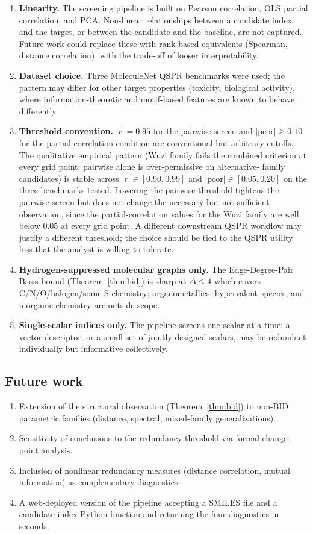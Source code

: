 \documentclass[11pt,a4paper]{article}
\theoremstyle{definition}
\begin{document}
\begin{enumerate}
\item \textbf{Linearity.} The screening pipeline is built on
Pearson correlation, OLS partial correlation, and PCA. Non-linear
relationships between a candidate index and the target, or between
the candidate and the baseline, are not captured. Future work
could replace these with rank-based equivalents (Spearman,
distance correlation), with the trade-off of looser
interpretability.
\item \textbf{Dataset choice.} Three MoleculeNet QSPR benchmarks
were used; the pattern may differ for other target properties (toxicity,
biological activity), where information-theoretic and motif-based
features are known to behave differently.
\item \textbf{Threshold convention.} $|r| = 0.95$ for the pairwise
screen and $|\mathrm{pcor}| \ge 0.10$ for the partial-correlation
condition are conventional but arbitrary cutoffs. The qualitative
empirical pattern (Wuzi family fails the combined criterion at
every grid point; pairwise alone is over-permissive on alternative-
family candidates) is stable across $|r| \in [0.90, 0.99]$ and
$|\mathrm{pcor}| \in [0.05, 0.20]$ on the three benchmarks tested.
Lowering the pairwise threshold tightens the pairwise screen but
does not change the necessary-but-not-sufficient observation, since
the partial-correlation values for the Wuzi family are well below
$0.05$ at every grid point. A different downstream QSPR workflow
may justify a different threshold; the choice should be tied to the
QSPR utility loss that the analyst is willing to tolerate.
\item \textbf{Hydrogen-suppressed molecular graphs only.} The
Edge-Degree-Pair Basis bound (Theorem~\ref{thm:bid}) is sharp at
$\Delta\le 4$ which covers C/N/O/halogen/some S chemistry;
organometallics, hypervalent species, and inorganic chemistry are
outside scope.
\item \textbf{Single-scalar indices only.} The pipeline screens one
scalar at a time; a vector descriptor, or a small set of jointly
designed scalars, may be redundant individually but informative
collectively.
\end{enumerate}

\subsection{Future work}

\begin{enumerate}
\item Extension of the structural observation
(Theorem~\ref{thm:bid}) to non-BID parametric families (distance,
spectral, mixed-family generalizations).
\item Sensitivity of conclusions to the redundancy threshold via
formal change-point analysis.
\item Inclusion of nonlinear redundancy measures (distance
correlation, mutual information) as complementary diagnostics.
\item A web-deployed version of the pipeline accepting a SMILES
file and a candidate-index Python function and returning the
four diagnostics in seconds.
\end{enumerate}
\end{document}
